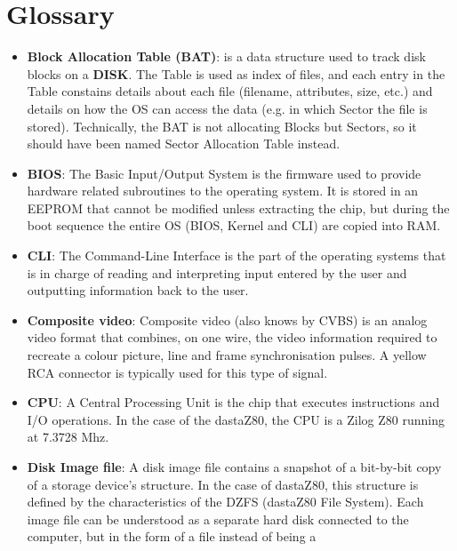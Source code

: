\section{Glossary}

\begin{itemize}
    \item \textbf{Block Allocation Table (BAT)}: is a data structure used to
        track disk blocks on a \textbf{DISK}. The Table is used as index of
        files, and each entry in the Table constains details about each file
        (filename, attributes, size, etc.) and details on how the OS can access
        the data (e.g. in which Sector the file is stored). Technically, the BAT
        is not allocating Blocks but Sectors, so it should have been named
        Sector Allocation Table instead.
    \item \textbf{BIOS}: The Basic Input/Output System is the firmware used to
        provide hardware related subroutines to the operating system. It is
        stored in an EEPROM that cannot be modified unless extracting the chip,
        but during the boot sequence the entire OS (BIOS, Kernel and CLI) are
        copied into RAM.
    \item \textbf{CLI}: The Command-Line Interface is the part of the operating
        systems that is in charge of reading and interpreting input entered by
        the user and outputting information back to the user.
    \item \textbf{Composite video}: Composite video (also knows by CVBS) is an
        analog video format that combines, on one wire, the video information
        required to recreate a colour picture, line and frame synchronisation
        pulses. A yellow RCA connector is typically used for this type of signal.
    \item \textbf{CPU}: A Central Processing Unit is the chip that executes
        instructions and I/O operations. In the case of the dastaZ80, the CPU is
        a Zilog Z80 running at 7.3728 Mhz.
    \item \textbf{Disk Image file}: A disk image file contains a snapshot of a
        bit-by-bit copy of a storage device's structure. In the case of dastaZ80,
        this structure is defined by the characteristics of the DZFS (dastaZ80
        File System). Each image file can be understood as a separate hard disk
        connected to the computer, but in the form of a file instead of being a

\end{itemize}
